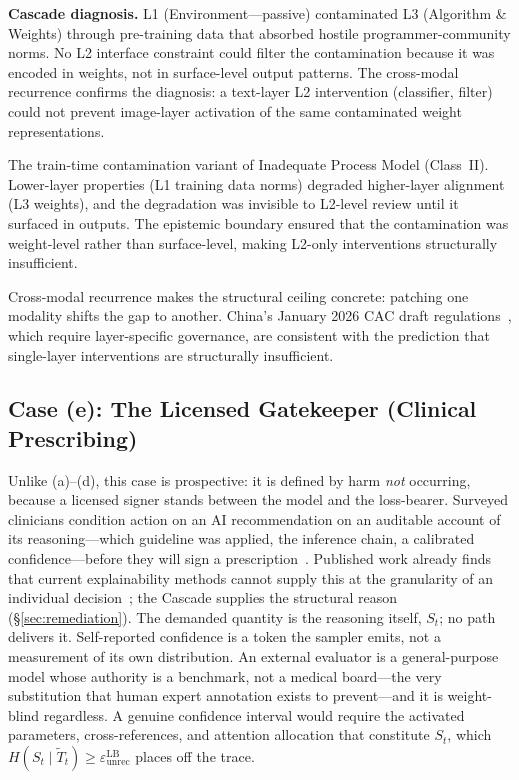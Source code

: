 \documentclass[11pt]{article}
\begin{document}
\textbf{Cascade diagnosis.} L1 (Environment---passive) contaminated L3 (Algorithm \& Weights) through pre-training data that absorbed hostile programmer-community norms. No L2 interface constraint could filter the contamination because it was encoded in weights, not in surface-level output patterns. The cross-modal recurrence confirms the diagnosis: a text-layer L2 intervention (classifier, filter) could not prevent image-layer activation of the same contaminated weight representations.

The train-time contamination variant of Inadequate Process Model (Class~II). Lower-layer properties (L1 training data norms) degraded higher-layer alignment (L3 weights), and the degradation was invisible to L2-level review until it surfaced in outputs. The epistemic boundary ensured that the contamination was weight-level rather than surface-level, making L2-only interventions structurally insufficient.

Cross-modal recurrence makes the structural ceiling concrete: patching one modality shifts the gap to another. China's January 2026 CAC draft regulations~\cite{cac2025draft}, which require layer-specific governance, are consistent with the prediction that single-layer interventions are structurally insufficient.

\subsection{Case (e): The Licensed Gatekeeper (Clinical Prescribing)}

Unlike (a)--(d), this case is prospective: it is defined by harm \emph{not} occurring, because a licensed signer stands between the model and the loss-bearer. Surveyed clinicians condition action on an AI recommendation on an auditable account of its reasoning---which guideline was applied, the inference chain, a calibrated confidence---before they will sign a prescription~\cite{tonekaboni2019, amann2020}. Published work already finds that current explainability methods cannot supply this at the granularity of an individual decision~\cite{ghassemi2021}; the Cascade supplies the structural reason (\S\ref{sec:remediation}). The demanded quantity is the reasoning itself, $S_t$; no path delivers it. Self-reported confidence is a token the sampler emits, not a measurement of its own distribution. An external evaluator is a general-purpose model whose authority is a benchmark, not a medical board---the very substitution that human expert annotation exists to prevent---and it is weight-blind regardless. A genuine confidence interval would require the activated parameters, cross-references, and attention allocation that constitute $S_t$, which $H(S_t\mid\tilde T_t)\ge\varepsilon_{\mathrm{unrec}}^{\mathrm{LB}}$ places off the trace.
\end{document}
